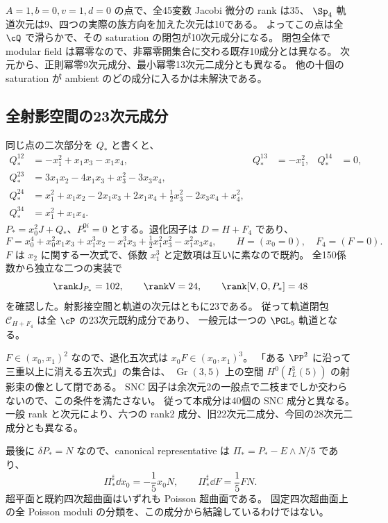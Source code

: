 $A=1,b=0,v=1,d=0$ の点で、全45変数 Jacobi 微分の rank は35、
$\Sp_4$ 軌道次元は9、四つの実際の族方向を加えた次元は10である。
よってこの点は全 $\cQ$ で滑らかで、その saturation の閉包が10次元成分になる。
閉包全体で modular field は冪零なので、非冪零開集合に交わる既存10成分とは異なる。
次元から、正則冪零9次元成分、最小冪零13次元二成分とも異なる。
他の十個の saturation が ambient のどの成分に入るかは未解決である。

\subsection{全射影空間の23次元成分}\label{subsec:quarticcomponent}
同じ点の二次部分を $Q_*$ と書くと、
\begin{align*}
 Q_*^{12}&=-x_1^2+x_1x_3-x_1x_4,&Q_*^{13}&=-x_1^2,&Q_*^{14}&=0,\\
 Q_*^{23}&=3x_1x_2-4x_1x_3+x_3^2-3x_3x_4,\\
 Q_*^{24}&=x_1^2+x_1x_2-2x_1x_3+2x_1x_4
                  +\tfrac12x_3^2-2x_3x_4+x_4^2,\\
 Q_*^{34}&=x_1^2+x_1x_4.
\end{align*}
$P_*=x_0^2J+Q_*$、$P_*^{0i}=0$ とする。退化因子は $D=H+F_4$ であり、
\begin{equation}\label{eq:quarticF}
 F=x_0^4+x_0^2x_1x_3+x_1^3x_2-x_1^3x_3
           +\tfrac12x_1^2x_3^2-x_1^2x_3x_4,
 \qquad H=(x_0=0),\quad F_4=(F=0).
\end{equation}
$F$ は $x_2$ に関する一次式で、係数 $x_1^3$ と定数項は互いに素なので既約。
全150係数から独立な二つの実装で
\[
 \rank\mathsf J_{P_*}=102,\qquad
 \rank\mathsf V=24,\qquad\rank[\mathsf V,\mathsf O,P_*]=48
\]
を確認した。射影接空間と軌道の次元はともに23である。
従って軌道閉包 $\mathcal C_{H+F_4}$ は全 $\cP$ の23次元既約成分であり、
一般元は一つの $\PGL_5$ 軌道となる。

$F\in(x_0,x_1)^2$ なので、退化五次式は $x_0F\in(x_0,x_1)^3$。
「ある $\PP^2$ に沿って三重以上に消える五次式」の集合は、
$\operatorname{Gr}(3,5)$ 上の空間 $H^0(I_L^3(5))$ の射影束の像として閉である。
SNC 因子は余次元2の一般点で二枝までしか交わらないので、この条件を満たさない。
従って本成分は40個の SNC 成分と異なる。
一般 rank と次元により、六つの rank2 成分、旧22次元二成分、今回の28次元二成分とも異なる。

最後に $\delta P_*=N$ なので、canonical representative は
$\Pi_*=P_*-E\wedge N/5$ であり、
\[
 \Pi_*^\sharp\dd x_0=-\frac15x_0N,\qquad
 \Pi_*^\sharp\dd F=\frac15FN.
\]
超平面と既約四次超曲面はいずれも Poisson 超曲面である。
固定四次超曲面上の全 Poisson moduli の分類を、この成分から結論しているわけではない。
